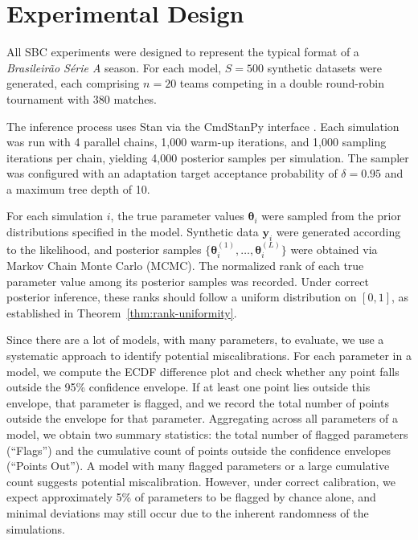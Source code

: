 \section{Experimental Design}
\label{sec:sbc_experimental_design}

All SBC experiments were designed to represent the typical format of a \textit{Brasileirão Série A} season.
For each model, $S = 500$ synthetic datasets were generated, each comprising $n = 20$ teams competing in a double round-robin tournament with $380$ matches.

The inference process uses Stan \cite{carpenter_2017} via the CmdStanPy interface \cite{cmdstanpy}.
Each simulation was run with 4 parallel chains, 1,000 warm-up iterations, and 1,000 sampling iterations per chain, yielding 4,000 posterior samples per simulation.
The sampler was configured with an adaptation target acceptance probability of $\delta = 0.95$ and a maximum tree depth of 10.

For each simulation $i$, the true parameter values $\boldsymbol{\theta}_i$ were sampled from the prior distributions specified in the model.
Synthetic data $\mathbf{y}_i$ were generated according to the likelihood, and posterior samples $\{\boldsymbol{\theta}_i^{(1)}, \ldots, \boldsymbol{\theta}_i^{(L)}\}$ were obtained via Markov Chain Monte Carlo (MCMC).
The normalized rank of each true parameter value among its posterior samples was recorded.
Under correct posterior inference, these ranks should follow a uniform distribution on $[0, 1]$, as established in Theorem~\ref{thm:rank-uniformity}.

Since there are a lot of models, with many parameters, to evaluate, we use a systematic approach to identify potential miscalibrations.
For each parameter in a model, we compute the ECDF difference plot and check whether any point falls outside the 95\% confidence envelope.
If at least one point lies outside this envelope, that parameter is flagged, and we record the total number of points outside the envelope for that parameter.
Aggregating across all parameters of a model, we obtain two summary statistics: the total number of flagged parameters (``Flags'') and the cumulative count of points outside the confidence envelopes (``Points Out'').
A model with many flagged parameters or a large cumulative count suggests potential miscalibration.
However, under correct calibration, we expect approximately 5\% of parameters to be flagged by chance alone, and minimal deviations may still occur due to the inherent randomness of the simulations.
